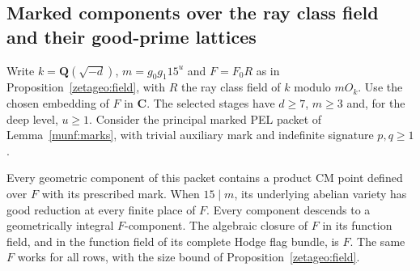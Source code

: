 \subsection{Marked components over the ray class field and their good-prime lattices}
\label{addh:section}

Write \(k=\mathbf Q(\sqrt{-d})\), \(m=g_0g_1 15^u\) and
\(F=F_0R\) as in Proposition~\ref{zetageo:field}, with \(R\)
the ray class field of \(k\) modulo \(mO_k\). Use the chosen embedding
of \(F\) in \(\mathbf C\). The selected stages have \(d\ge7\), \(m\ge3\)
and, for the deep level, \(u\ge1\). Consider the principal marked PEL
packet of Lemma~\ref{munf:marks}, with trivial auxiliary mark and
indefinite signature \(p,q\ge1\).

\begin{proposition}
\label{addh:constants}
Every geometric component of this packet contains a product CM point
defined over \(F\) with its prescribed mark. When \(15\mid m\), its
underlying abelian variety has good reduction at every finite place
of \(F\). Every component descends to a geometrically integral
\(F\)-component. The algebraic closure of \(F\) in its function
field, and in the function field of its complete Hodge flag bundle,
is \(F\). The same \(F\) works for all rows, with the size bound of
Proposition~\ref{zetageo:field}.
\end{proposition}
